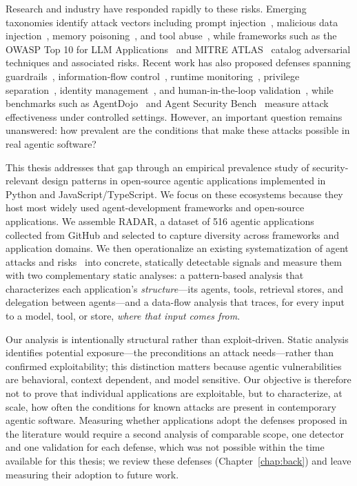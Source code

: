 Research and industry have responded rapidly to these risks. Emerging taxonomies identify attack vectors including prompt injection~\cite{greshake, pleasefix, agentdojo}, malicious data injection~\cite{agent-card-poisoning}, memory poisoning~\cite{memory-poison-sunil}, and tool abuse~\cite{tooltweak}, while frameworks such as the OWASP Top 10 for LLM Applications~\cite{owasp} and MITRE ATLAS~\cite{mitre-atlas} catalog adversarial techniques and associated risks. Recent work has also proposed defenses spanning guardrails~\cite{xiang2024guardagent,pro2guard}, information-flow control~\cite{costa2025fides}, runtime monitoring~\cite{pro2guard}, privilege separation~\cite{shi2025progent}, identity management~\cite{openid-identity}, and human-in-the-loop validation~\cite{hula}, while benchmarks such as AgentDojo~\cite{agentdojo} and Agent Security Bench~\cite{asb} measure attack effectiveness under controlled settings. However, an important question remains unanswered: how prevalent are the conditions that make these attacks possible in real agentic software?

This thesis addresses that gap through an empirical prevalence study of security-relevant design patterns in open-source agentic applications implemented in Python and JavaScript/TypeScript. We focus on these ecosystems because they host most widely used agent-development frameworks and open-source applications. We assemble RADAR, a dataset of 516 agentic applications collected from GitHub and selected to capture diversity across frameworks and application domains. We then operationalize an existing systematization of agent attacks and risks~\cite{kim2026sok} into concrete, statically detectable signals and measure them with two complementary static analyses: a pattern-based analysis that characterizes each application's \emph{structure}---its agents, tools, retrieval stores, and delegation between agents---and a data-flow analysis that traces, for every input to a model, tool, or store, \emph{where that input comes from}.

Our analysis is intentionally structural rather than exploit-driven. Static analysis identifies potential exposure---the preconditions an attack needs---rather than confirmed exploitability; this distinction matters because agentic vulnerabilities are behavioral, context dependent, and model sensitive. Our objective is therefore not to prove that individual applications are exploitable, but to characterize, at scale, how often the conditions for known attacks are present in contemporary agentic software. Measuring whether applications adopt the defenses proposed in the literature would require a second analysis of comparable scope, one detector and one validation for each defense, which was not possible within the time available for this thesis; we review these defenses (Chapter~\ref{chap:back}) and leave measuring their adoption to future work.

